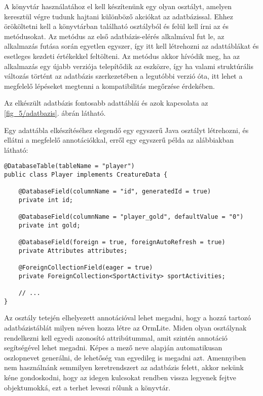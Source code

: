 A könyvtár használatához el kell készítenünk egy olyan osztályt, amelyen keresztül végre tudunk hajtani különböző akciókat az adatbázissal. 
Ehhez örököltetni kell a könyvtárban található  osztályból és felül kell írni az  és  metódusokat.
Az  metódus az első adatbázis-elérés alkalmával fut le, az alkalmazás futása során egyetlen egyszer, így itt kell létrehozni az adattáblákat és esetleges kezdeti értékekkel feltölteni. 
Az  metódus akkor hívódik meg, ha az alkalmazás egy újabb verziója telepítődik az eszközre, így ha valami struktúrális változás történt az adatbázis szerkezetében a legutóbbi verzió óta, itt lehet a megfelelő lépéseket megtenni a kompatibilitás megőrzése érdekében. 

Az elkészült adatbázis fontosabb adattáblái és azok kapcsolata az \ref{fig_5/adatbazis}. ábrán látható. 


Egy adattábla elkészítéséhez elegendő egy egyszerű Java osztályt létrehozni, és ellátni a megfelelő annotációkkal, erről egy egyszerű példa az alábbiakban látható:

\begin{lstlisting}
@DatabaseTable(tableName = "player")
public class Player implements CreatureData {

    @DatabaseField(columnName = "id", generatedId = true)
    private int id;

    @DatabaseField(columnName = "player_gold", defaultValue = "0")
    private int gold;

    @DatabaseField(foreign = true, foreignAutoRefresh = true)
    private Attributes attributes;

    @ForeignCollectionField(eager = true)
    private ForeignCollection<SportActivity> sportActivities;

    // ...
}
\end{lstlisting}

Az osztály tetején elhelyezett  annotációval lehet megadni, hogy a hozzá tartozó adatbázistáblát milyen néven hozza létre az OrmLite. 
Miden olyan osztálynak rendelkezni kell egyedi azonosító attribútummal, amit szintén annotáció segítségével lehet megadni. 
Képes a mező neve alapján automatikusan oszlopnevet generálni, de lehetőség van egyedileg is megadni azt. 
Amennyiben nem használnánk semmilyen keretrendszert az adatbázis felett, akkor nekünk kéne gondoskodni, hogy az idegen kulcsokat rendben vissza legyenek fejtve objektumokká, ezt a terhet leveszi rólunk a könyvtár. 

